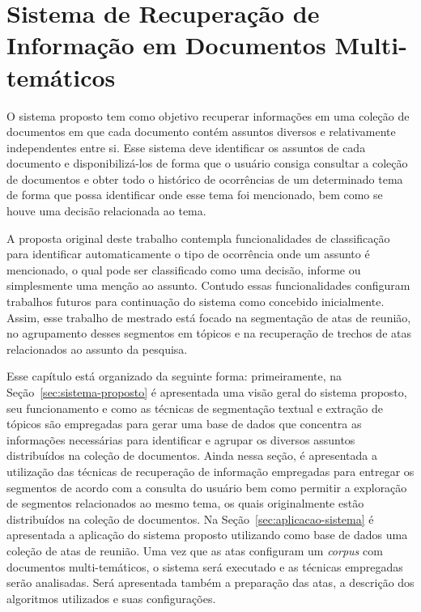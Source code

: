 \chapter{Sistema de Recuperação de Informação em Documentos Multi-temáticos}
\label{cap3}


O sistema proposto tem como objetivo recuperar informações em uma coleção de documentos em que cada documento contém assuntos diversos e relativamente independentes entre si. Esse sistema deve identificar os assuntos de cada documento e disponibilizá-los de forma que o usuário consiga consultar a coleção de documentos e obter todo o histórico de ocorrências de um determinado tema de forma que possa identificar onde esse tema foi mencionado, bem como se houve uma decisão relacionada ao tema.

A proposta original deste trabalho contempla funcionalidades de classificação para identificar automaticamente o tipo de ocorrência onde um assunto é mencionado, o qual pode ser classificado como uma decisão, informe ou simplesmente uma menção ao assunto. Contudo essas funcionalidades configuram trabalhos futuros para continuação do sistema como concebido inicialmente. Assim, esse trabalho de mestrado está focado na segmentação de atas de reunião, no agrupamento desses segmentos em tópicos e na recuperação de trechos de atas relacionados ao assunto da pesquisa.

Esse capítulo está organizado da seguinte forma: primeiramente, na Seção~\ref{sec:sistema-proposto} é apresentada uma visão geral do sistema proposto, seu funcionamento e como as técnicas de segmentação textual e extração de tópicos são empregadas para gerar uma base de dados que concentra as informações necessárias para identificar e agrupar os diversos assuntos distribuídos na coleção de documentos. Ainda nessa seção, é apresentada a utilização das técnicas de recuperação de informação empregadas para entregar os segmentos de acordo com a consulta do usuário bem como permitir a exploração de segmentos relacionados ao mesmo tema, os quais originalmente estão distribuídos na coleção de documentos.  
Na Seção~\ref{sec:aplicacao-sistema} é apresentada a aplicação do sistema proposto utilizando como base de dados uma coleção de atas de reunião. Uma vez que as atas configuram um \textit{corpus} com documentos multi-temáticos, o sistema será executado e as técnicas empregadas serão analisadas. Será apresentada também a preparação das atas, a descrição dos algoritmos utilizados e suas configurações.






